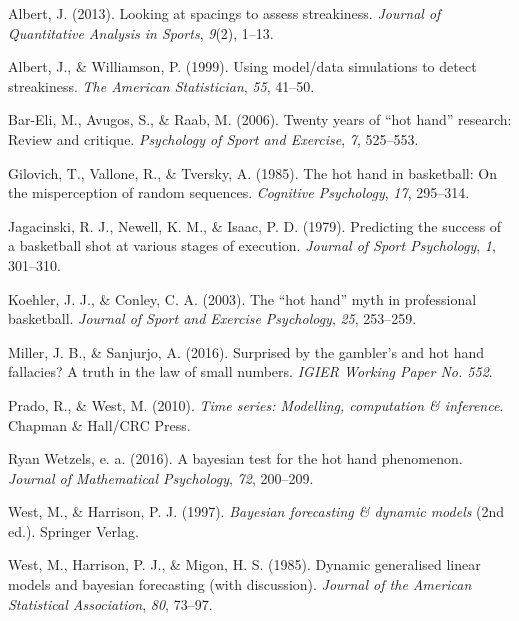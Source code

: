 \documentclass[12pt,twoside]{dukestatscithesis}
\theoremstyle{definition}
\theoremstyle{definition}
\theoremstyle{definition}
\theoremstyle{remark}
\begin{document}
\hypertarget{ref-albert13}{}
Albert, J. (2013). Looking at spacings to assess streakiness.
\emph{Journal of Quantitative Analysis in Sports}, \emph{9}(2), 1--13.

\hypertarget{ref-albert99}{}
Albert, J., \& Williamson, P. (1999). Using model/data simulations to
detect streakiness. \emph{The American Statistician}, \emph{55}, 41--50.

\hypertarget{ref-bareli06}{}
Bar-Eli, M., Avugos, S., \& Raab, M. (2006). Twenty years of ``hot
hand'' research: Review and critique. \emph{Psychology of Sport and
Exercise}, \emph{7}, 525--553.

\hypertarget{ref-gilovich85}{}
Gilovich, T., Vallone, R., \& Tversky, A. (1985). The hot hand in
basketball: On the misperception of random sequences. \emph{Cognitive
Psychology}, \emph{17}, 295--314.

\hypertarget{ref-jagacinski79}{}
Jagacinski, R. J., Newell, K. M., \& Isaac, P. D. (1979). Predicting the
success of a basketball shot at various stages of execution.
\emph{Journal of Sport Psychology}, \emph{1}, 301--310.

\hypertarget{ref-koehler03}{}
Koehler, J. J., \& Conley, C. A. (2003). The ``hot hand'' myth in
professional basketball. \emph{Journal of Sport and Exercise
Psychology}, \emph{25}, 253--259.

\hypertarget{ref-miller16}{}
Miller, J. B., \& Sanjurjo, A. (2016). Surprised by the gambler's and
hot hand fallacies? A truth in the law of small numbers. \emph{IGIER
Working Paper No. 552}.

\hypertarget{ref-west10}{}
Prado, R., \& West, M. (2010). \emph{Time series: Modelling, computation
\& inference}. Chapman \& Hall/CRC Press.

\hypertarget{ref-wetzels16}{}
Ryan Wetzels, e. a. (2016). A bayesian test for the hot hand phenomenon.
\emph{Journal of Mathematical Psychology}, \emph{72}, 200--209.

\hypertarget{ref-west97}{}
West, M., \& Harrison, P. J. (1997). \emph{Bayesian forecasting \&
dynamic models} (2nd ed.). Springer Verlag.

\hypertarget{ref-west85}{}
West, M., Harrison, P. J., \& Migon, H. S. (1985). Dynamic generalised
linear models and bayesian forecasting (with discussion). \emph{Journal
of the American Statistical Association}, \emph{80}, 73--97.


\end{document}

